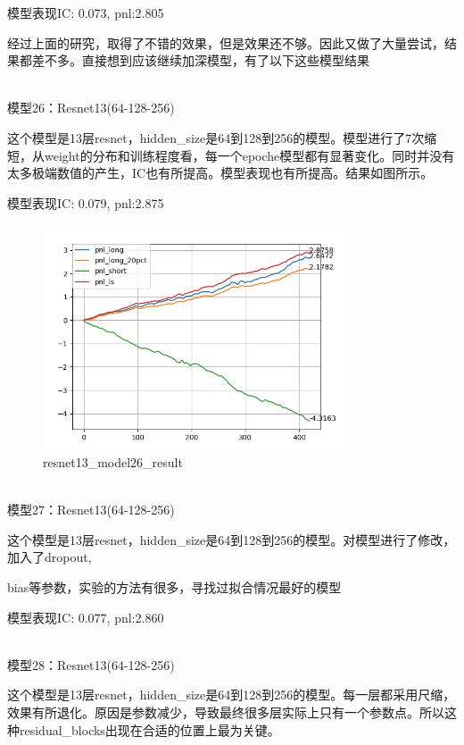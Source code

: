 \documentclass[11pt]{ctexart}
\begin{document}
模型表现{\kaishu \small IC: 0.073, pnl:2.805}

经过上面的研究，取得了不错的效果，但是效果还不够。因此又做了大量尝试，结果都差不多。直接想到应该继续加深模型，有了以下这些模型结果

~\\
模型26：Resnet13(64-128-256)

这个模型是13层resnet，hidden\_size是64到128到256的模型。模型进行了7次缩短，从weight的分布和训练程度看，每一个epoche模型都有显著变化。同时并没有太多极端数值的产生，IC也有所提高。模型表现也有所提高。结果如图所示。

模型表现{\kaishu \small IC: 0.079, pnl:2.875}

\begin{figure}[H]

\begin{center}
\includegraphics[width=0.8\textwidth]{result.PNG}
\end{center}
\caption{resnet13\_model26\_result}
\label{FIG.7}
\end{figure}

~\\
模型27：Resnet13(64-128-256)

这个模型是13层resnet，hidden\_size是64到128到256的模型。对模型进行了修改，加入了dropout, \par bias等参数，实验的方法有很多，寻找过拟合情况最好的模型

模型表现{\kaishu \small IC: 0.077, pnl:2.860}

~\\
模型28：Resnet13(64-128-256)

这个模型是13层resnet，hidden\_size是64到128到256的模型。每一层都采用尺缩，效果有所退化。原因是参数减少，导致最终很多层实际上只有一个参数点。所以这种residual\_blocks出现在合适的位置上最为关键。
\end{document}
